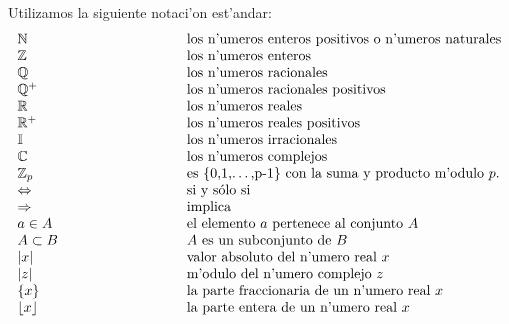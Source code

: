 
\ve

\noindent Utilizamos la siguiente notaci'on est'andar:
$$
\begin{array}{lcl}
\mathbb{N} & \hspace{1in} & \mbox{los n'umeros enteros positivos o n'umeros
naturales} \\
\mathbb{Z} & \hspace{1in} & \mbox{los n'umeros enteros} \\
\mathbb{Q} & \hspace{1in} & \mbox{los n'umeros racionales} \\
\mathbb{Q}^+ & \hspace{1in} & \mbox{los n'umeros racionales positivos} \\
\mathbb{R}  & \hspace{1in} & \mbox{los n'umeros reales}\\
\mathbb{R}^+  & \hspace{1in} & \mbox{los n'umeros reales positivos}\\
\mathbb{I} & \hspace{1in} & \mbox{los n'umeros irracionales} \\
\mathbb{C} & \hspace{1in} & \mbox{los n'umeros complejos} \\
\mathbb{Z}_p & \hspace{1in} & \mbox{es \{0,1,\dots,p-1\} con la suma y producto m'odulo $p$.} \\
\Leftrightarrow & \hspace{1in} & \mbox{si y s\'olo si}\\
\Rightarrow & \hspace{1in} & \mbox{implica}\\
a \in A & \hspace{1in} & \mbox{el elemento} \ a \ \mbox{pertenece al conjunto}
\ A\\
A \subset B & \hspace{1in} & A \ \mbox{es un subconjunto de} \ B\\
|x| & \hspace{1in} & \mbox{valor absoluto del n'umero real} \ x\\
|z| & \hspace{1in} & \mbox{m'odulo del n'umero complejo} \ z\\
\{ x\} & \hspace{1in} & \mbox{la parte fraccionaria de un n'umero real} \ x\\
\lfloor x \rfloor & \hspace{1in} & \mbox{la parte entera de un n'umero real} \ x\\

\end{array}$$

